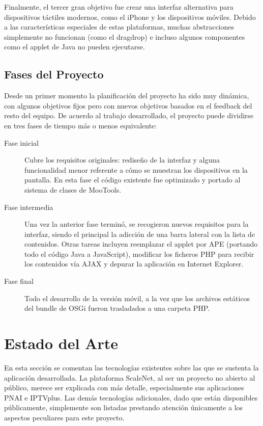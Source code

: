Finalmente, el tercer gran objetivo fue crear una interfaz alternativa para dispositivos táctiles modernos, como el iPhone y los dispositivos móviles.
Debido a las características especiales de estas plataformas, muchas abstracciones simplemente no funcionan (como el drag\et{}drop) e incluso algunos componentes como el applet de Java no pueden ejecutarse.

\subsection{Fases del Proyecto} %
\label{sub:fases_del_proyecto}

Desde un primer momento la planificación del proyecto ha sido muy dinámica, con algunos objetivos fijos pero con nuevos objetivos basados en el feedback del resto del equipo.
De acuerdo al trabajo desarrollado, el proyecto puede dividirse en tres fases de tiempo más o menos equivalente:

\begin{description}
  \item[Fase inicial] Cubre los requisitos originales: rediseño de la interfaz y alguna funcionalidad menor referente a cómo se muestran los dispositivos en la pantalla.
  En esta fase el código existente fue optimizado y portado al sistema de clases de MooTools.
  \item[Fase intermedia] Una vez la anterior fase terminó, se recogieron nuevos requisitos para la interfaz, siendo el principal la adicción de una barra lateral con la lista de contenidos.
  Otras tareas incluyen reemplazar el applet por APE (portando todo el código Java a JavaScript), modificar los ficheros PHP para recibir los contenidos vía AJAX y depurar la aplicación en Internet Explorer.
  \item[Fase final] Todo el desarrollo de la versión móvil, a la vez que los archivos estáticos del bundle de OSGi fueron trasladados a una carpeta PHP.
\end{description}
\nicesectionending

\section{Estado del Arte} %
\label{sec:estado_del_arte}

En esta sección se comentan las tecnologías existentes sobre las que se sustenta la aplicación desarrollada.
La plataforma ScaleNet, al ser un proyecto no abierto al público, merece ser explicada con más detalle, especialmente sus aplicaciones PNAI e IPTVplus.
Las demás tecnologías adicionales, dado que están disponibles públicamente, simplemente son listadas prestando atención únicamente a los aspectos peculiares para este proyecto.


